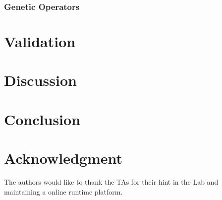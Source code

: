 \documentclass[conference]{IEEEtran}
\begin{document}
    \subsubsection{Genetic Operators}

\section{Validation}
	 
\section{Discussion}


\section{Conclusion}

\section*{Acknowledgment}

The authors would like to thank the TAs for their hint in the Lab and maintaining a online runtime platform. 


% 
% 



\end{document}
